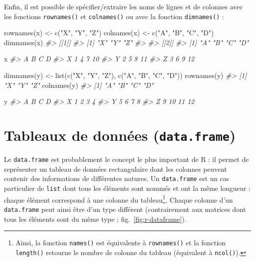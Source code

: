 \documentclass[
  french,
]{scrbook}
\newenvironment{Shaded}{\begin{snugshade}}{\end{snugshade}}
\newcommand{\CommentTok}[1]{\textcolor[rgb]{0.56,0.35,0.01}{\textit{#1}}}
\newcommand{\FunctionTok}[1]{\textcolor[rgb]{0.00,0.00,0.00}{#1}}
\newcommand{\NormalTok}[1]{#1}
\newcommand{\OtherTok}[1]{\textcolor[rgb]{0.56,0.35,0.01}{#1}}
\newcommand{\StringTok}[1]{\textcolor[rgb]{0.31,0.60,0.02}{#1}}
\begin{document}
Enfin, il est possible de spécifier/extraire les noms de lignes et de colonnes avec les fonctions \texttt{rownames()} et \texttt{colnames()} ou avec la fonction \texttt{dimnames()} :

\begin{Shaded}
\begin{Highlighting}[]
\FunctionTok{rownames}\NormalTok{(x) }\OtherTok{\textless{}{-}} \FunctionTok{c}\NormalTok{(}\StringTok{"X"}\NormalTok{, }\StringTok{"Y"}\NormalTok{, }\StringTok{"Z"}\NormalTok{)}
\FunctionTok{colnames}\NormalTok{(x) }\OtherTok{\textless{}{-}} \FunctionTok{c}\NormalTok{(}\StringTok{"A"}\NormalTok{, }\StringTok{"B"}\NormalTok{, }\StringTok{"C"}\NormalTok{, }\StringTok{"D"}\NormalTok{)}
\FunctionTok{dimnames}\NormalTok{(x)}
\CommentTok{\#\textgreater{} [[1]]}
\CommentTok{\#\textgreater{} [1] "X" "Y" "Z"}
\CommentTok{\#\textgreater{} }
\CommentTok{\#\textgreater{} [[2]]}
\CommentTok{\#\textgreater{} [1] "A" "B" "C" "D"}

\NormalTok{x}
\CommentTok{\#\textgreater{}   A B C  D}
\CommentTok{\#\textgreater{} X 1 4 7 10}
\CommentTok{\#\textgreater{} Y 2 5 8 11}
\CommentTok{\#\textgreater{} Z 3 6 9 12}

\FunctionTok{dimnames}\NormalTok{(y) }\OtherTok{\textless{}{-}} \FunctionTok{list}\NormalTok{(}\FunctionTok{c}\NormalTok{(}\StringTok{"X"}\NormalTok{, }\StringTok{"Y"}\NormalTok{, }\StringTok{"Z"}\NormalTok{), }\FunctionTok{c}\NormalTok{(}\StringTok{"A"}\NormalTok{, }\StringTok{"B"}\NormalTok{, }\StringTok{"C"}\NormalTok{, }\StringTok{"D"}\NormalTok{))}
\FunctionTok{rownames}\NormalTok{(y)}
\CommentTok{\#\textgreater{} [1] "X" "Y" "Z"}
\FunctionTok{colnames}\NormalTok{(y)}
\CommentTok{\#\textgreater{} [1] "A" "B" "C" "D"}

\NormalTok{y}
\CommentTok{\#\textgreater{}   A  B  C  D}
\CommentTok{\#\textgreater{} X 1  2  3  4}
\CommentTok{\#\textgreater{} Y 5  6  7  8}
\CommentTok{\#\textgreater{} Z 9 10 11 12}
\end{Highlighting}
\end{Shaded}

\hypertarget{r-dataframe}{%
\section{\texorpdfstring{Tableaux de données (\texttt{data.frame})}{Tableaux de données (data.frame)}}\label{r-dataframe}}

Le \texttt{data.frame} est probablement le concept le plus important de R : il permet de représenter un tableau de données rectangulaire dont les colonnes peuvent contenir des informations de différentes natures. Un \texttt{data.frame} est un cas particulier de \texttt{list} dont tous les éléments sont nommés et ont la même longueur : chaque élément correspond à une colonne du tableau\footnote{Ainsi, la fonction \texttt{names()} est équivalente à \texttt{rownames()} et la fonction \texttt{length()} retourne le nombre de colonne du tableau (équivalent à \texttt{ncol()}).}. Chaque colonne d'un \texttt{data.frame} peut ainsi être d'un type différent (contrairement aux matrices dont tous les éléments sont du même type ; fig.~\ref{fig:r-dataframe}).
\end{document}
